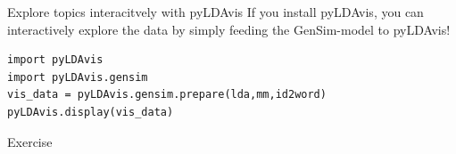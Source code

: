 \documentclass[handout]{beamer}
\begin{document}
\begin{frame}[plain]
\end{frame}



\begin{frame}[fragile]{Explore topics interacitvely with pyLDAvis}
If you install pyLDAvis, you can interactively explore the data by simply feeding the GenSim-model to pyLDAvis!
\begin{lstlisting}
import pyLDAvis
import pyLDAvis.gensim
vis_data = pyLDAvis.gensim.prepare(lda,mm,id2word)
pyLDAvis.display(vis_data)
\end{lstlisting}
\end{frame}

\begin{frame}[plain]
\end{frame}

\begin{frame}
	Exercise
\end{frame}
\end{document}
